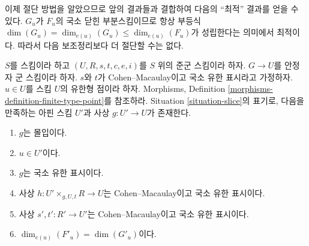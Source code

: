 \noindent
이제 절단 방법을 알았으므로 앞의 결과들과 결합하여 다음의 ``최적'' 결과를
얻을 수 있다. $G_u$가 $F_u$의 국소 닫힌 부분스킴이므로 항상 부등식
$\dim(G_u) = \dim_{e(u)}(G_u) \leq \dim_{e(u)}(F_u)$가 성립한다는 의미에서
최적이다. 따라서 다음 보조정리보다 더 절단할 수는 없다.

\begin{lemma}
\label{lemma-max-slice}
$S$를 스킴이라 하고 $(U, R, s, t, c, e, i)$를 $S$ 위의 준군 스킴이라 하자.
$G \to U$를 안정자 군 스킴이라 하자. $s$와 $t$가 Cohen--Macaulay이고
국소 유한 표시라고 가정하자. $u \in U$를 스킴 $U$의 유한형 점이라 하자.
Morphisms, Definition \ref{morphisms-definition-finite-type-point}를 참조하라.
Situation \ref{situation-slice}의 표기로, 다음을 만족하는 아핀 스킴 $U'$과
사상 $g : U' \to U$가 존재한다.
\begin{enumerate}
\item $g$는 몰입이다.
\item $u \in U'$이다.
\item $g$는 국소 유한 표시이다.
\item 사상 $h : U' \times_{g, U, t} R \longrightarrow U$는
Cohen--Macaulay이고 국소 유한 표시이다.
\item 사상 $s', t' : R' \to U'$는 Cohen--Macaulay이고 국소 유한 표시이다.
\item $\dim_{e(u)}(F'_u) = \dim(G'_u)$이다.
\end{enumerate}
\end{lemma}

